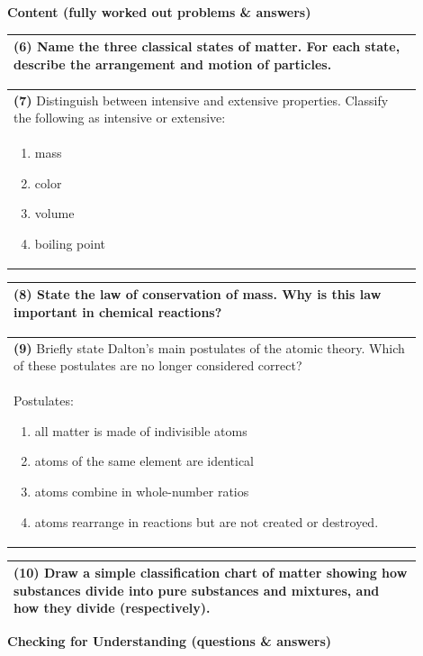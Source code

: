 \documentclass{article}
\begin{document}
\newpage
\noindent
{\large \textbf{Content (fully worked out problems \& answers)}} \\[0.2em]
\noindent
\begin{tabular}{|p{0.9\linewidth}|}
\hline
\vspace{0.2cm}

\textbf{(6)} Name the three classical states of matter. For each state, describe the arrangement and motion of particles. \\
\hline
\end{tabular}
\newpage
\begin{tabular}{|p{0.9\linewidth}|}
\hline
\vspace{0.2cm}

\textbf{(7)} Distinguish between intensive and extensive properties. Classify the following as intensive or extensive: \\
\begin{enumerate}
    \item mass
    \item color
    \item volume
    \item boiling point
\end{enumerate}
\\
\hline
\end{tabular}
\newpage
\begin{tabular}{|p{0.9\linewidth}|}
\hline
\vspace{0.2cm}

\textbf{(8)} State the law of conservation of mass. Why is this law important in chemical reactions? \\
\hline
\end{tabular}
\newpage
\begin{tabular}{|p{0.9\linewidth}|}
\hline
\vspace{0.2cm}

\textbf{(9)} Briefly state Dalton’s main postulates of the atomic theory. Which of these postulates are no longer considered correct? \\
Postulates:
\begin{enumerate} 
    \item all matter is made of indivisible atoms
    \item atoms of the same element are identical
    \item atoms combine in whole-number ratios
    \item atoms rearrange in reactions but are not created or destroyed. 
\end{enumerate}
\hline
\end{tabular}
\newpage
\begin{tabular}{|p{0.9\linewidth}|}
\hline
\vspace{0.2cm}

\textbf{(10)} Draw a simple classification chart of matter showing how substances divide into pure substances and mixtures, and how they divide (respectively). \\
\hline
\end{tabular}
\newpage
\noindent
{\large \textbf{Checking for Understanding (questions \& answers)}} \\
\end{document}
